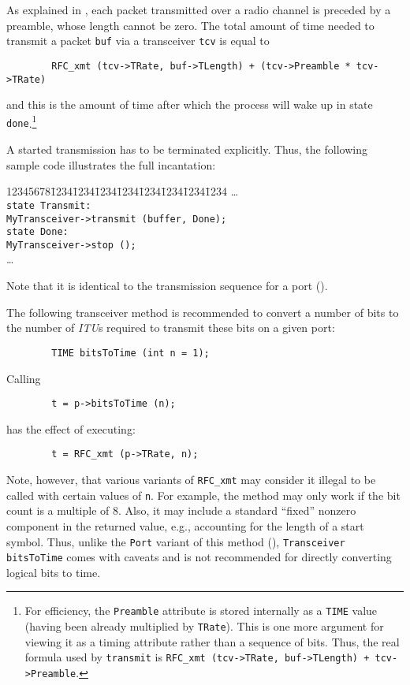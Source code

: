 As explained in , each packet transmitted over a
radio channel is preceded by a preamble, whose length cannot be zero.
The total amount of time needed to transmit a packet {\tt buf} via a
transceiver {\tt tcv} is equal to
\begin{verbatim}
        RFC_xmt (tcv->TRate, buf->TLength) + (tcv->Preamble * tcv->TRate)
\end{verbatim}
\noindent
and this is the amount of time after which the process will wake up
in state {\tt done}.\footnote{For efficiency, the {\tt Preamble} attribute
is stored internally as a {\tt TIME} value (having been already multiplied by
{\tt TRate}).
This is one more argument for viewing it as a timing attribute rather
than a sequence of bits.
Thus, the real formula used by {\tt transmit} is
{\tt RFC\_xmt (tcv->TRate, buf->TLength) + tcv->Preamble}.}

A started transmission has to be terminated explicitly.
Thus, the following sample code illustrates the full incantation:
{\tt\begin{tabbing}
12345678\=1234\=1234\=1234\=1234\=1234\=1234\=1234\=1234\kill
\> \ldots \\
\> {\tt state Transmit:}\\
\> \> {\tt MyTransceiver->transmit (buffer, Done);}\\
\> {\tt state Done:}\\
\> \> {\tt MyTransceiver->stop ();}\\
\> \>\ldots
\end{tabbing}}
\noindent
Note that it is identical to the transmission sequence for a port
().

The following transceiver method is recommended
to convert a number of bits to the number of {\em ITU\/}s
required to transmit these bits on a given port:
\begin{verbatim}
        TIME bitsToTime (int n = 1);
\end{verbatim}
Calling
\begin{verbatim}
        t = p->bitsToTime (n);
\end{verbatim}
has the effect of executing:
\begin{verbatim}
        t = RFC_xmt (p->TRate, n);
\end{verbatim}
\noindent
Note, however, that various variants of {\tt RFC\_xmt} may consider it illegal
to be called with certain values of {\tt n}.
For example, the method may only work if the bit count is a multiple of 8.
Also, it may include a standard ``fixed'' nonzero component in the returned
value, e.g., accounting for the length of a start symbol.
Thus, unlike the {\tt Port} variant of this method (),
{\tt Transceiver} {\tt bitsToTime} comes with caveats and is not recommended
for directly converting logical bits to time.


